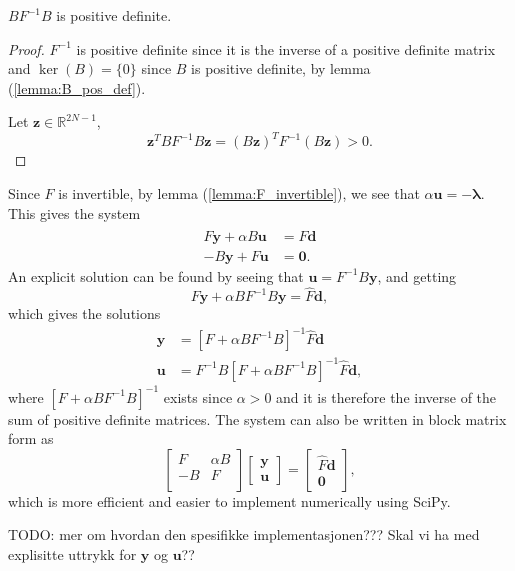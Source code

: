 \begin{lemma}
    $BF^{-1}B$ is positive definite.
\end{lemma}
\begin{proof}
    $F^{-1}$ is positive definite since it is the inverse of a positive definite matrix and $\ker(B) = \{0\}$ since $B$ is positive definite, by lemma (\ref{lemma:B_pos_def}).
    
    Let $\mathbf{z} \in \mathds{R}^{2N-1}$,
    $$\mathbf{z}^T BF^{-1}B \mathbf{z} = (B\mathbf{z})^T F^{-1}(B\mathbf{z}) > 0.$$
\end{proof}
Since $F$ is invertible, by lemma (\ref{lemma:F_invertible}), we see that $\alpha \mathbf{u}= -\mathbf{\lambda}$. 
This gives the system
\begin{align}
    \label{eq:lagrange_conditions}
     F \mathbf{y} + \alpha B \mathbf{u} &= \hat{F}\mathbf{d} \\
    -B \mathbf{y} + F \mathbf{u} &= \mathbf{0}.
\end{align}
An explicit solution can be found by seeing that $\mathbf{u}=F^{-1}B \mathbf{y}$, and getting
$$ F\mathbf{y} + \alpha B F^{-1}B \mathbf{y} = \hat{F}\mathbf{d},$$
which gives the solutions
\begin{align*}
    \mathbf{y} &= \left[F + \alpha B F^{-1}B \right]^{-1} \hat{F}\mathbf{d} \\
    \mathbf{u} &= F^{-1} B \left[F + \alpha B F^{-1}B \right]^{-1} \hat{F}\mathbf{d},
\end{align*}
where $\left[F + \alpha B F^{-1}B \right]^{-1}$ exists since $\alpha > 0$ and it is therefore the inverse of the sum of positive definite matrices.
The system can also be written in block matrix form as
$$
\begin{bmatrix}
   F & \alpha B \\
   -B & F \\
\end{bmatrix}
\begin{bmatrix}
    \mathbf{y} \\
    \mathbf{u}
\end{bmatrix}
= 
\begin{bmatrix} \hat{F}\mathbf{d} \\
    \mathbf{0}
\end{bmatrix},
$$
which is more efficient and easier to implement numerically using SciPy.

TODO: mer om hvordan den spesifikke implementasjonen??? Skal vi ha med explisitte uttrykk for $\mathbf{y}$ og $\mathbf{u}$??

